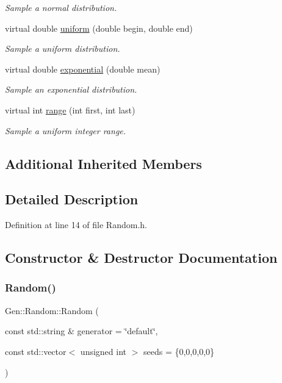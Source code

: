 \begin{DoxyCompactItemize}
\begin{DoxyCompactList}\small\item\em Sample a normal distribution. \end{DoxyCompactList}\item 
virtual double \hyperlink{class_wire_cell_1_1_gen_1_1_random_aa470ac91289961da741d0d31ccfb83d8}{uniform} (double begin, double end)
\begin{DoxyCompactList}\small\item\em Sample a uniform distribution. \end{DoxyCompactList}\item 
virtual double \hyperlink{class_wire_cell_1_1_gen_1_1_random_adc1edd1dadf04f9e78d1c6480f6f4f1a}{exponential} (double mean)
\begin{DoxyCompactList}\small\item\em Sample an exponential distribution. \end{DoxyCompactList}\item 
virtual int \hyperlink{class_wire_cell_1_1_gen_1_1_random_a84b86a3aaa791e75eb3eb80e1efb1d7e}{range} (int first, int last)
\begin{DoxyCompactList}\small\item\em Sample a uniform integer range. \end{DoxyCompactList}\end{DoxyCompactItemize}
\subsection*{Additional Inherited Members}


\subsection{Detailed Description}


Definition at line 14 of file Random.\+h.



\subsection{Constructor \& Destructor Documentation}
\mbox{\label{class_wire_cell_1_1_gen_1_1_random_a081d40d1959772cf64334f6f6896a795}} 
\subsubsection{\texorpdfstring{Random()}{Random()}}
{\footnotesize\ttfamily Gen\+::\+Random\+::\+Random (\begin{DoxyParamCaption}\item[{const std\+::string \&}]{generator = {\ttfamily \char`\"{}default\char`\"{}},  }\item[{const std\+::vector$<$ unsigned int $>$}]{seeds = {\ttfamily \{0,0,0,0,0\}} }\end{DoxyParamCaption})}



